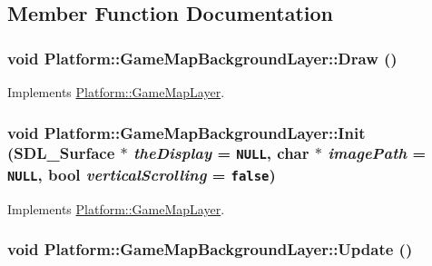 \subsection{Member Function Documentation}
\hypertarget{class_platform_1_1_game_map_background_layer_f6910e7841ae5315baa5fd956202a982}{
\subsubsection[{Draw}]{\setlength{\rightskip}{0pt plus 5cm}void Platform::GameMapBackgroundLayer::Draw ()}}
\label{df/d72/class_platform_1_1_game_map_background_layer_f6910e7841ae5315baa5fd956202a982}




Implements \hyperlink{class_platform_1_1_game_map_layer_cc44f193d8cf01e97fe34cb7da72e640}{Platform::GameMapLayer}.\hypertarget{class_platform_1_1_game_map_background_layer_449a95c15187b1ae358a0216a589df3f}{
\subsubsection[{Init}]{\setlength{\rightskip}{0pt plus 5cm}void Platform::GameMapBackgroundLayer::Init (SDL\_\-Surface $\ast$ {\em theDisplay} = {\tt NULL}, \/  char $\ast$ {\em imagePath} = {\tt NULL}, \/  bool {\em verticalScrolling} = {\tt false})}}
\label{df/d72/class_platform_1_1_game_map_background_layer_449a95c15187b1ae358a0216a589df3f}




Implements \hyperlink{class_platform_1_1_game_map_layer_a25bd5a4d69574dfb3cefdd544e36e8d}{Platform::GameMapLayer}.\hypertarget{class_platform_1_1_game_map_background_layer_6cc21a3c3418b8c76c010963bef37800}{
\subsubsection[{Update}]{\setlength{\rightskip}{0pt plus 5cm}void Platform::GameMapBackgroundLayer::Update ()}}
\label{df/d72/class_platform_1_1_game_map_background_layer_6cc21a3c3418b8c76c010963bef37800}




